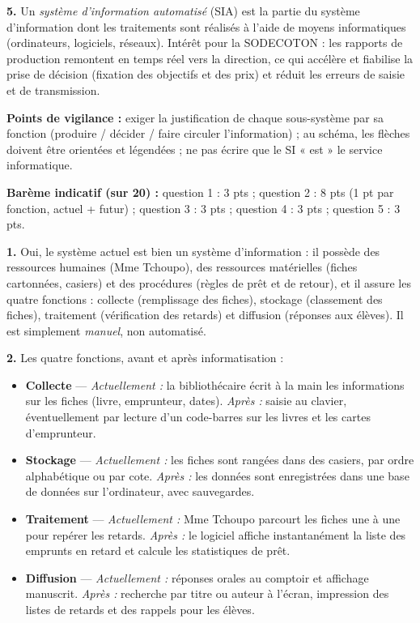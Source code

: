 \documentclass[11pt]{article}
\begin{document}
\begin{corrige}
\textbf{5.} Un \emph{système d'information automatisé} (SIA) est la partie du système d'information dont les traitements sont réalisés à l'aide de moyens informatiques (ordinateurs, logiciels, réseaux). Intérêt pour la SODECOTON : les rapports de production remontent en temps réel vers la direction, ce qui accélère et fiabilise la prise de décision (fixation des objectifs et des prix) et réduit les erreurs de saisie et de transmission.

\textbf{Points de vigilance :} exiger la justification de chaque sous-système par sa fonction (produire / décider / faire circuler l'information) ; au schéma, les flèches doivent être orientées et légendées ; ne pas écrire que le SI « est » le service informatique.
\end{corrige}

\begin{corrige}
\textbf{Barème indicatif (sur 20) :} question 1 : 3 pts ; question 2 : 8 pts (1 pt par fonction, actuel + futur) ; question 3 : 3 pts ; question 4 : 3 pts ; question 5 : 3 pts.

\textbf{1.} Oui, le système actuel est bien un système d'information : il possède des ressources humaines (Mme Tchoupo), des ressources matérielles (fiches cartonnées, casiers) et des procédures (règles de prêt et de retour), et il assure les quatre fonctions : collecte (remplissage des fiches), stockage (classement des fiches), traitement (vérification des retards) et diffusion (réponses aux élèves). Il est simplement \emph{manuel}, non automatisé.

\textbf{2.} Les quatre fonctions, avant et après informatisation :
\begin{itemize}
\item \textbf{Collecte} — \emph{Actuellement :} la bibliothécaire écrit à la main les informations sur les fiches (livre, emprunteur, dates). \emph{Après :} saisie au clavier, éventuellement par lecture d'un code-barres sur les livres et les cartes d'emprunteur.
\item \textbf{Stockage} — \emph{Actuellement :} les fiches sont rangées dans des casiers, par ordre alphabétique ou par cote. \emph{Après :} les données sont enregistrées dans une base de données sur l'ordinateur, avec sauvegardes.
\item \textbf{Traitement} — \emph{Actuellement :} Mme Tchoupo parcourt les fiches une à une pour repérer les retards. \emph{Après :} le logiciel affiche instantanément la liste des emprunts en retard et calcule les statistiques de prêt.
\item \textbf{Diffusion} — \emph{Actuellement :} réponses orales au comptoir et affichage manuscrit. \emph{Après :} recherche par titre ou auteur à l'écran, impression des listes de retards et des rappels pour les élèves.
\end{itemize}


\end{corrige}
\end{document}
